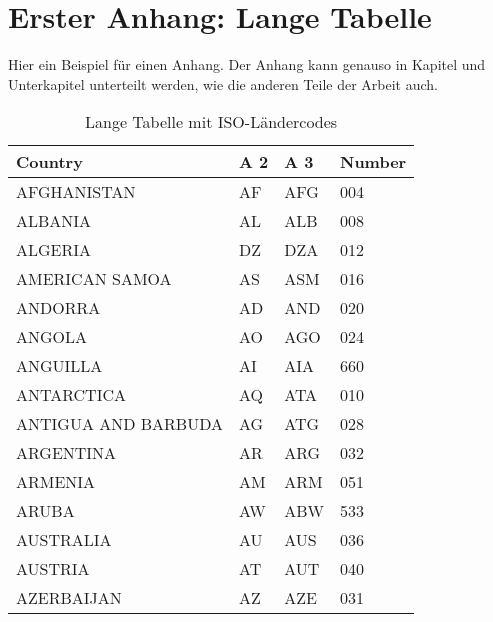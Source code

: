 \chapter{Erster Anhang: Lange Tabelle}
\label{AnhangA}

Hier ein Beispiel für einen Anhang. Der Anhang kann genauso in Kapitel und Unterkapitel unterteilt werden, wie die anderen Teile der Arbeit auch.

\sffamily
\begin{footnotesize}
  \begin{longtable}[c]{ p{} p{} p{} p{}}
    \caption[Tabelle mit ISO-Ländercodes]                       %
        {Lange Tabelle mit ISO-Ländercodes\label{laendercodes}} %
        \\
    \toprule
    \textbf{Country} & \textbf{A 2} & \textbf{A 3} & \textbf{Number} \\
    \midrule
    AFGHANISTAN                                    & AF & AFG & 004 \\
    ALBANIA                                        & AL & ALB & 008 \\
    ALGERIA                                        & DZ & DZA & 012 \\
    AMERICAN SAMOA                                 & AS & ASM & 016 \\
    ANDORRA                                        & AD & AND & 020 \\
    ANGOLA                                         & AO & AGO & 024 \\
    ANGUILLA                                       & AI & AIA & 660 \\
    ANTARCTICA                                     & AQ & ATA & 010 \\
    ANTIGUA AND BARBUDA                            & AG & ATG & 028 \\
    ARGENTINA                                      & AR & ARG & 032 \\
    ARMENIA                                        & AM & ARM & 051 \\
    ARUBA                                          & AW & ABW & 533 \\
    AUSTRALIA                                      & AU & AUS & 036 \\
    AUSTRIA                                        & AT & AUT & 040 \\
    AZERBAIJAN                                     & AZ & AZE & 031 \\

\end{longtable}
\end{footnotesize}
